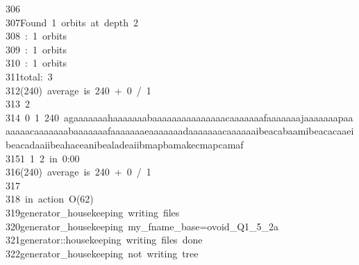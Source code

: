 \begin{tabbing}
306\>\\[0pt]
307\>Found\ 1\ orbits\ at\ depth\ 2\\[0pt]
308\ :\ 1\ orbits\\[0pt]
309\ :\ 1\ orbits\\[0pt]
310\ :\ 1\ orbits\\[0pt]
311\>total:\ 3\\[0pt]
312\>(240)\ average\ is\ 240\ +\ 0\ /\ 1\\[0pt]
313\>\ 2\\[0pt]
314\ 0\ 1\ 240\ agaaaaaaahaaaaaaabaaaaaaaaaaaaaaacaaaaaaafaaaaaaajaaaaaaapaaaaaaacaaaaaaabaaaaaaafaaaaaaaeaaaaaaadaaaaaaacaaaaaaibeacabaamibeacacaaeibeacadaaiibeahaceanibealadeaiibmapbamakecmapcamaf\\[0pt]
315\>1\ 1\ 2\ in\ 0:00\\[0pt]
316\>(240)\ average\ is\ 240\ +\ 0\ /\ 1\\[0pt]
317\>\\[0pt]
318\>\ in\ action\ O(62)\\[0pt]
319\>generator\_housekeeping\ writing\ files\\[0pt]
320\>generator\_housekeeping\ my\_fname\_base=ovoid\_Q1\_5\_2a\\[0pt]
321\>generator::housekeeping\ writing\ files\ done\\[0pt]
322\>generator\_housekeeping\ not\ writing\ tree\\[0pt]

\end{tabbing}
